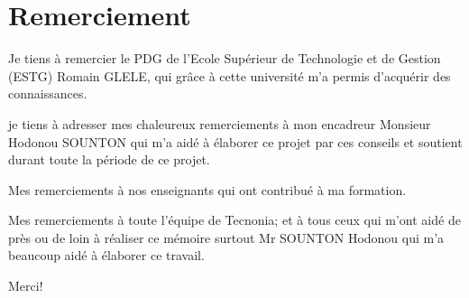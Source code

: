 \chapter{Remerciement}


Je tiens à remercier le PDG de l’Ecole Supérieur de Technologie et de
Gestion (ESTG) Romain GLELE, qui grâce à cette
université m'a permis d’acquérir des connaissances.

je  tiens à adresser mes chaleureux remerciements à mon encadreur Monsieur
Hodonou SOUNTON qui m'a aidé à élaborer ce projet
par ces conseils et soutient durant toute la période de
ce projet.

Mes remerciements
à nos enseignants qui ont contribué à ma formation.

Mes remerciements à toute l'équipe de Tecnonia; et à tous ceux qui m'ont aidé de près ou de loin à réaliser ce mémoire surtout
Mr SOUNTON Hodonou qui m'a beaucoup aidé à élaborer ce travail.


        Merci!